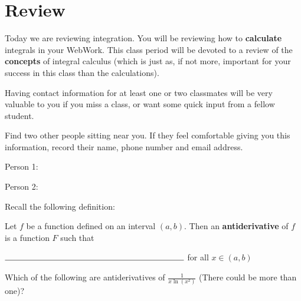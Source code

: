 \documentclass[handout]{ximera}
\begin{document}
\section{Review}

 Today we are reviewing integration.  You will be reviewing how to \textbf{calculate} integrals in your WebWork.  This class period will be devoted to a review of the \textbf{concepts} of integral calculus (which is just as, if not more, important for your success in this class than the calculations).
 
\begin{exercise}
	
	Having contact information for at least one or two classmates will be very valuable to you if you miss a class, or want some quick input from a fellow student.
	
   	Find two other people sitting near you.  If they feel comfortable giving you this information, record their name, phone number and email address.
   	
   	Person 1:

	Person 2:
	

\end{exercise}


 
 Recall the following definition:
 
\begin{definition}
		Let $f$ be a function defined on an interval $(a,b)$.  Then an \textbf{antiderivative} of $f$ is a function $F$ such that 
		
		\begin{center}$\rule{3 in}{0.15mm}$ for all $x \in (a,b)$
		\end{center}
\end{definition}

\begin{question}
	Which of the following are antiderivatives of $\frac{1}{x\ln(x^2)}$ (There could be more than one)?
	\begin{selectAll}
	\end{selectAll}
\end{question}
 
\end{document}
